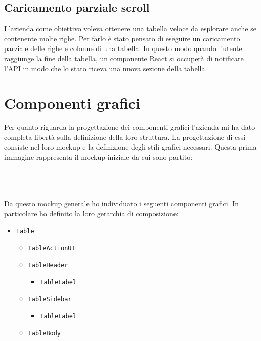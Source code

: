 \subsection*{Caricamento parziale scroll}
L'azienda come obiettivo voleva ottenere una tabella veloce da esplorare anche se contenente molte righe. Per farlo è stato pensato di eseguire un caricamento parziale delle righe e colonne di una tabella. In questo modo quando l'utente raggiunge la fine della tabella, un componente React si occuperà di notificare l'API in modo che lo stato riceva una nuova sezione della tabella.

\section{Componenti grafici}
Per quanto riguarda la progettazione dei componenti grafici l'azienda mi ha dato completa libertà sulla definizione della loro struttura. La progettazione di essi consiste nel loro mockup e la definizione degli stili grafici necessari. Questa prima immagine rappresenta il mockup iniziale da cui sono partito: 
\\
\\
\begin{minipage}{\linewidth}
\end{minipage}
\mbox{} 
\\
\\
Da questo mockup generale ho individuato i seguenti componenti grafici. In particolare ho definito la loro gerarchia di composizione:
\begin{itemize}
	\item \verb|Table|
	\begin{itemize}
		\item \verb|TableActionUI|
		\item \verb|TableHeader|
		\begin{itemize}
			\item \verb|TableLabel|
		\end{itemize}
		\item \verb|TableSidebar|
		\begin{itemize}
			\item \verb|TableLabel|
		\end{itemize}
		\item \verb|TableBody|
	\end{itemize}
\end{itemize}

